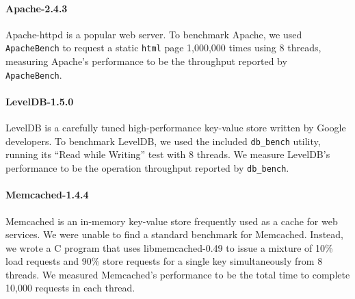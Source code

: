 \documentclass[preprint,9pt]{sigplanconf}
\begin{document}
\paragraph{Apache-2.4.3} 
Apache-httpd is a popular web server.  To benchmark Apache, we used {\tt
ApacheBench} to request a static {\tt html} page 1,000,000 times using 8
threads, measuring Apache's performance to be the throughput reported by {\tt
ApacheBench}.  

\paragraph{LevelDB-1.5.0}
LevelDB is a carefully tuned high-performance key-value store written by Google
developers. To benchmark LevelDB, we used the included {\tt db\_bench} utility,
running its ``Read while Writing'' test with 8 threads.  We measure LevelDB's
performance to be the operation throughput reported by {\tt db\_bench}.

\paragraph{Memcached-1.4.4}
Memcached is an in-memory key-value store frequently used as a cache for web
services.  We were unable to find a standard benchmark for Memcached.  Instead,
we wrote a C program that uses libmemcached-0.49 to issue a
mixture of 10\% load requests and 90\% store requests for a single key 
simultaneously from 8 threads.  We measured Memcached's performance to be the
total time to complete 10,000 requests in each thread.
\end{document}
